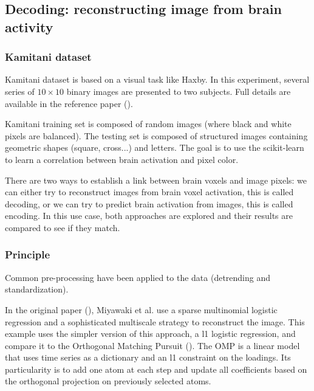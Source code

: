 \documentclass{frontiersSCNS} %
\newcommand{\alex}[1]{\todo[inline, color=green!40]{#1}}
\begin{document}

\subsection{Decoding: reconstructing image from brain activity}

\subsubsection{Kamitani dataset}

Kamitani dataset is based on a visual task like Haxby. In this experiment,
several series of $10\times10$ binary images are presented to two subjects.
Full details are available in the reference paper
(\cite{miyawaki2008}).

Kamitani training set is composed of random images (where black and white pixels
are balanced). The testing set is composed of structured images containing
geometric shapes (square, cross...) and letters. The goal is to use the
scikit-learn to learn a correlation between brain
activation and pixel color. 

There are two ways to establish a link between brain voxels and image pixels: we
can either try to reconstruct images from brain voxel activation, this is called
decoding, or we can try to predict brain activation from images, this is called
encoding. In this use case, both approaches are explored and their results are
compared to see if they match. 

\subsubsection{Principle} %

Common pre-processing have been applied to the data (detrending and
standardization).

In the original paper (\cite{miyawaki2008}), Miyawaki et al. use a sparse multinomial
logistic regression and a sophisticated multiscale strategy to reconstruct the image.
This example uses the simpler version of this approach, a l1 logistic
regression, and compare it to the Orthogonal
Matching Pursuit (\cite{mallat1993}). The OMP is a linear model that uses
time series as a dictionary and an l1 constraint on the loadings. Its
particularity is to add one atom at each step and update all coefficients
based on the orthogonal projection on previously selected atoms.
\end{document}
